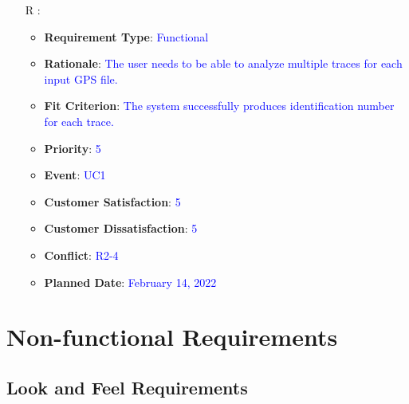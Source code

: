 \documentclass[12pt, titlepage]{article}
\newcounter{reqnum} %
\begin{document}
\begin{itemize}
\item[R\refstepcounter{reqnum}\thereqnum
\label{R_Inputs_1}:] 
\begin{itemize}
    \item \textbf{Requirement Type}: \textcolor{blue}{Functional}
    \item \textbf{Rationale}: \textcolor{blue}{The user needs to be able to analyze multiple traces for each input GPS file.}
    \item \textbf{Fit Criterion}: \textcolor{blue}{The system successfully produces identification number for each trace.}
    \item \textbf{Priority}: \textcolor{blue}{5}
    \item \textbf{Event}: \textcolor{blue}{UC1}
    \item \textbf{Customer Satisfaction}: \textcolor{blue}{5}
    \item \textbf{Customer Dissatisfaction}: \textcolor{blue}{5}
    \item \textbf{Conflict}: \textcolor{blue}{R2-4}
    \item \textbf{Planned Date}: \textcolor{blue}{February 14, 2022}
\end{itemize}

\end{itemize}


\section{Non-functional Requirements}

\subsection{Look and Feel Requirements}
\end{document}

